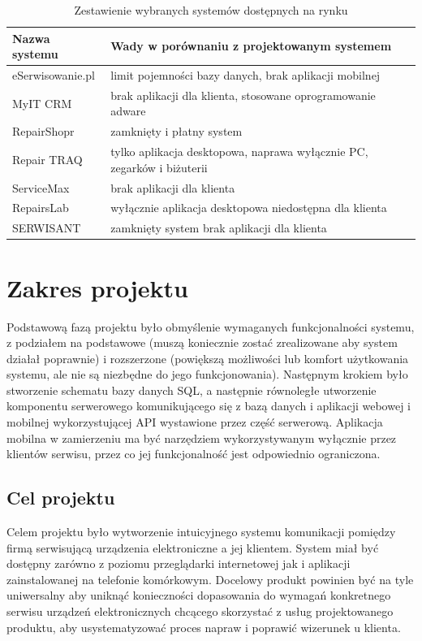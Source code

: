 \documentclass[a4paper,11pt]{article}
\begin{document}
\begin{table}[H]
	\centering
	\caption{Zestawienie wybranych systemów dostępnych na rynku}
	\bgroup
	\begin{tabular}{l|l|}
		\hline
		\multicolumn{1}{|l||}{Nazwa systemu} & Wady w porównaniu z projektowanym systemem\\ \hline \hline
		\multicolumn{1}{|l||}{eSerwisowanie.pl} & limit pojemności bazy danych, brak aplikacji mobilnej \\ \hline
		\multicolumn{1}{|l||}{MyIT CRM} & brak aplikacji dla klienta, stosowane oprogramowanie adware \\ \hline
		\multicolumn{1}{|l||}{RepairShopr} & zamknięty i płatny system \\ \hline
		\multicolumn{1}{|l||}{Repair TRAQ} & tylko aplikacja desktopowa, naprawa wyłącznie PC, zegarków i biżuterii \\ \hline
		\multicolumn{1}{|l||}{ServiceMax} & brak aplikacji dla klienta \\ \hline
		\multicolumn{1}{|l||}{RepairsLab} & wyłącznie aplikacja desktopowa niedostępna dla klienta \\ \hline
		\multicolumn{1}{|l||}{SERWISANT} & zamknięty system brak aplikacji dla klienta \\ \hline
		
		
	\end{tabular}
	\egroup
\end{table}
\section{Zakres projektu}
Podstawową fazą projektu było obmyślenie wymaganych funkcjonalności systemu, z podziałem na podstawowe (muszą koniecznie zostać zrealizowane aby system działał poprawnie) i rozszerzone (powiększą możliwości lub komfort użytkowania systemu, ale nie są niezbędne do jego funkcjonowania). Następnym krokiem było stworzenie schematu bazy danych SQL, a następnie równoległe utworzenie komponentu serwerowego komunikującego się z bazą danych i aplikacji webowej i mobilnej wykorzystującej API wystawione przez część serwerową. Aplikacja mobilna w zamierzeniu ma być narzędziem wykorzystywanym wyłącznie przez klientów serwisu, przez co jej funkcjonalność jest odpowiednio ograniczona.
\subsection{Cel projektu}
Celem projektu było wytworzenie intuicyjnego systemu komunikacji pomiędzy firmą serwisującą urządzenia elektroniczne a jej klientem. System miał być dostępny zarówno z poziomu przeglądarki internetowej jak i aplikacji zainstalowanej na telefonie komórkowym. Docelowy produkt powinien być na tyle uniwersalny aby uniknąć konieczności dopasowania do wymagań konkretnego serwisu urządzeń elektronicznych chcącego skorzystać z usług projektowanego produktu, aby usystematyzować proces napraw i poprawić wizerunek u klienta.
\end{document}
